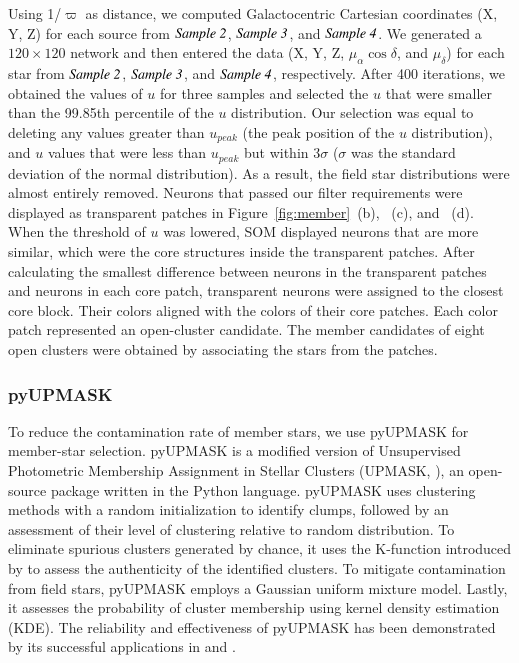 \documentclass{aa} %
\begin{document}
Using 1/$\varpi$ as distance, we computed Galactocentric Cartesian coordinates (X, Y, Z) for each source from {$\it Sample~2 $}, {$\it Sample~3 $}, and {$\it Sample~4 $}. We generated a
$120\times120$ network and then entered the data (X, Y, Z, $\mu_{\alpha} \cos{\delta}$, and $\mu_\delta$) for each star from {$\it Sample~2 $}, {$\it Sample~3 $}, and {$\it Sample~4 $}, respectively. 
After 400 iterations, we obtained the values of $u$ for three samples and selected the $u$ that were smaller
than the 99.85th percentile of the $u$ distribution. Our selection was equal to deleting any values greater than 
$u_{peak}$ (the peak position of the $u$ distribution), and $u$ values that were less than 
$u_{peak}$ but within 3$\sigma$ ($\sigma$ was the standard deviation of the normal distribution). As a 
result, the field star distributions were almost entirely removed. 
Neurons that passed our filter requirements were displayed as transparent patches in 
Figure~\ref{fig:member}~(b), ~(c), and ~(d).
When the threshold of $u$ was lowered, SOM displayed neurons that are more similar, which were the core structures 
inside the transparent patches. After calculating the smallest difference between 
neurons in the transparent patches and neurons in each core patch, transparent neurons were assigned to the closest core block. Their colors aligned with the colors of their core patches. Each color patch represented an open-cluster candidate. The member 
candidates of eight open clusters were obtained by associating the stars from the patches. 

\subsubsection{pyUPMASK} \label{subsec:pyUPMASK}

To reduce the contamination rate of member stars, we use pyUPMASK for member-star selection.
pyUPMASK is a modified version of Unsupervised Photometric Membership Assignment in Stellar Clusters (UPMASK, \citealt{2014A&A...561A..57K}), an open-source package written in the Python language. pyUPMASK uses clustering methods with a random initialization to identify clumps, followed by an assessment of their level of clustering relative to random distribution. To eliminate spurious clusters generated by chance, it uses the K-function introduced by \citet{Ripley1976,Ripley1979} to assess the authenticity of the identified clusters. To mitigate contamination from field stars, pyUPMASK employs a Gaussian uniform mixture model. Lastly, it assesses the probability of cluster membership using kernel density estimation (KDE). The reliability and effectiveness of pyUPMASK has been demonstrated by its successful applications in \citet{2022RAA....22e5022B} and \citet{2023ApJS..265...12Q}.
\end{document}
